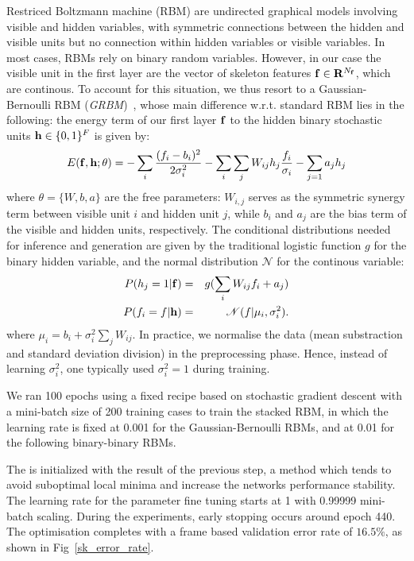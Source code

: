 %
Restriced Boltzmann machine (RBM) are undirected graphical models involving visible and hidden variables,
with symmetric connections between the hidden and visible units but no connection within hidden variables
or visible variables.
%
In most cases, RBMs rely on binary random variables.
%
However, in our case the visible unit in the first layer are the vector of skeleton features $\mathbf{f} \in \mathbf{R}^{N_{\mathbf{f}}}$, which are continous.
To account for this situation, we thus resort to a Gaussian-Bernoulli RBM (\emph{GRBM})~\cite{salakhutdinov2009learning},
whose main difference w.r.t. standard RBM lies in the following:
the energy term of our first layer $\mathbf{f}$ to the hidden binary stochastic units $\mathbf{h} \in \{0,1\}^F$ is given by:
\begin{equation}
    E(\skfeature,\rbmh;\theta) =-\sum_{i} \frac{(\skfeatureel_i-b_i)^2}{2\sigma_i^2} -\sum_{i} \sum_{j} W_{ij}  \rbmhel_j \frac{\skfeatureel_i}{\sigma_i}- \sum_{j=1}a_j\rbmhel_j
\label{GRBMenergy}
\end{equation}
where $\theta=\{W,b,a\}$ are the free parameters: $W_{i,j}$ serves as the symmetric synergy term between visible unit $i$ and hidden unit $j$,
while $b_i$ and $a_j$ are the bias term of the visible and hidden units, respectively.
%
The conditional distributions needed for inference and generation are given by the traditional logistic function $g$ for the binary hidden variable, and the normal distribution $\mathscr{N}$  for the continous variable:
\begin{eqnarray}
    P(h_j=1 | \mathbf{f}) & = & g (\sum_i W_{ij} f_i+a_j) \\
    P(f_i=f|\mathbf{h}) & = & \mathscr{N}( f |\mu_i,\sigma_i^2).
\end{eqnarray}
where $\mu_i=b_i+\sigma_i^2 \sum_j W_{ij}$.
In practice, we normalise the data (mean substraction and standard deviation division) in the preprocessing phase.
Hence, instead of learning $\sigma_i^2$, one typically used  $\sigma_i^2=1$ during training.

We ran 100 epochs using a fixed recipe based on stochastic gradient descent with a mini-batch size of 200 training cases
to train  the stacked RBM, in which the learning rate is fixed at 0.001 for the Gaussian-Bernoulli RBMs,
and at 0.01 for the following binary-binary RBMs.






%
%
The \DBN is initialized with the result of the previous step, a method which tends to avoid suboptimal local minima and increase
the networks performance stability.
%
The learning rate for the parameter fine tuning
starts at 1 with 0.99999 mini-batch scaling. During the experiments, early stopping occurs around epoch 440.
The optimisation completes with a frame based validation error rate of $16.5\%$, as shown in  Fig~\ref{sk_error_rate}.

